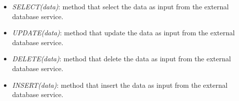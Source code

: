 \documentclass{article}
\begin{document}
\begin{itemize}
    		\begin{itemize}
        		\item {\it SELECT(data)}: method that select the data as input from the external database service.
        		\item {\it UPDATE(data)}: method that update the data as input from the external database service.
        		\item {\it DELETE(data)}: method that delete the data as input from the external database service.
        		\item {\it INSERT(data)}: method that insert the data as input from the external database service.
    		\end{itemize}
	\end{itemize}
	
	\pagebreak
	
\end{document}
